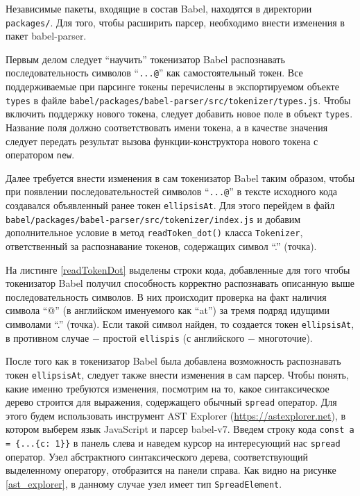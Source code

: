 \documentclass[14pt, a4paper]{article}
\def\code#1{\texttt{#1}} %
\begin{document}
Независимые пакеты, входящие в состав Babel, находятся в директории \code{packages/}. Для того, чтобы 
расширить парсер, необходимо внести изменения в пакет babel-parser.

Первым делом следует ``научить'' токенизатор Babel распознавать последовательность символов ``\code{...@}'' 
как самостоятельный токен. Все поддерживаемые при парсинге токены перечислены в экспортируемом объекте 
\code{types} в файле \code{babel/packages/babel-parser/src/tokenizer/types.js}. Чтобы включить поддержку нового токена,
следует добавить новое поле в объект \code{types}. Название поля должно соответствовать имени токена, а
в качестве значения следует передать результат вызова функции-конструктора нового токена с оператором \code{new}. 



Далее требуется внести изменения в сам токенизатор Babel таким образом, чтобы при появлении последовательностей символов 
``\code{...@}'' в тексте исходного кода создавался объявленный ранее токен \code{ellipsisAt}. Для этого 
перейдем в файл \code{babel/packages/babel-parser/src/tokenizer/index.js} и
добавим дополнительное условие в метод \code{readToken\_dot()} класса \code{Tokenizer}, ответственный за распознавание токенов,
содержащих символ ``.'' (точка).


На листинге \ref{readTokenDot} выделены строки кода, добавленные для того чтобы токенизатор Babel 
получил способность корректно распознавать описанную выше последовательность символов. В них происходит 
проверка на факт наличия символа ``@'' (в английском именуемого как ``at'') за тремя подряд идущими  
символами ``.'' (точка). Если такой символ найден, то создается токен \code{ellipsisAt}, в противном случае
$-$ простой \code{ellispis} (с английского $-$ многоточие).

После того как в токенизатор Babel была добавлена возможность распознавать токен \code{ellipsisAt},
следует также внести изменения в сам парсер. Чтобы понять, какие именно требуются изменения, посмотрим на то, какое
синтаксическое дерево строится для выражения, содержащего обычный \code{spread} оператор. Для этого будем использовать 
инструмент AST Explorer (\url{https://astexplorer.net}), в котором выберем язык JavaScript и парсер babel-v7.
Введем строку кода \code{const a = \{...\{c: 1\}\}} в панель слева и наведем курсор на интересующий 
нас \code{spread} оператор. Узел абстрактного синтаксического дерева, соответствующий выделенному оператору,
отобразится на панели справа. Как видно на рисунке \ref{ast_explorer}, в данному случае узел имеет тип 
\code{SpreadElement}.
\end{document}
